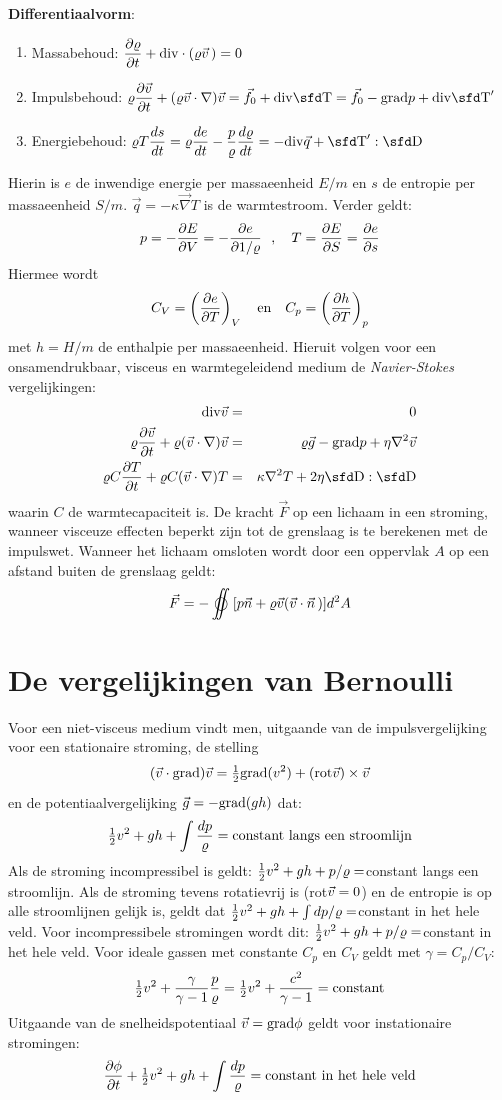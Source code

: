 \documentclass[twoside]{report}
\begin{document}
{\large\bf Differentiaalvorm}:
\begin{enumerate}
\item Massabehoud: $\displaystyle\frac{\partial \varrho}{\partial t}+{\rm div}\cdot(\varrho\vec{v}\,)=0$
\item Impulsbehoud: $\displaystyle\varrho\Q{\vv}{t}+(\varrho\vv\cdot\nabla)\vv=\vec{f}_0+{\rm div}\TT=\vec{f}_0-{\rm grad}p+{\rm div}\TT'$
\item Energiebehoud: $\displaystyle\varrho T\frac{ds}{dt}=\varrho\frac{de}{dt}-\frac{p}{\varrho}\frac{d\varrho}{dt}=-{\rm div}\vec{q}+\TT':\DD$
\end{enumerate}
Hierin is $e$ de inwendige energie per massaeenheid $E/m$ en $s$ de entropie
per massaeenheid $S/m$. $\vec{q}=-\kappa\vec{\nabla}T$ is de warmtestroom.
Verder geldt:
\[
p=-\frac{\partial E}{\partial V}=-\frac{\partial e}{\partial 1/\varrho}~~,~~~T=\frac{\partial E}{\partial S}=\frac{\partial e}{\partial s}
\]
Hiermee wordt
\[
C_V=\left(\frac{\partial e}{\partial T}\right)_{V}~~~\mbox{en}~~~C_p=\left(\frac{\partial h}{\partial T}\right)_{p}
\]
met $h=H/m$ de enthalpie per massaeenheid.
\npar
Hieruit volgen voor een onsamendrukbaar, visceus en warmtegeleidend medium
de {\it Navier-Stokes} vergelijkingen:
\begin{eqnarray*}
{\rm div}\vv&=&0\\
\varrho\Q{\vv}{t}+\varrho(\vv\cdot\nabla)\vv&=&\varrho\vec{g}-{\rm grad}p+\eta\nabla^2\vv\\
\varrho C\Q{T}{t}+\varrho C(\vv\cdot\nabla)T&=&\kappa\nabla^2 T+2\eta\DD:\DD
\end{eqnarray*}
waarin $C$ de warmtecapaciteit is. De kracht $\vec{F}$ op een lichaam in een
stroming, wanneer visceuze effecten beperkt zijn tot de grenslaag is te
berekenen met de impulswet. Wanneer het lichaam omsloten wordt door een
oppervlak $A$ op een afstand buiten de grenslaag geldt:
\[
\vec{F}=-\oiint[p\vec{n}+\varrho\vv(\vv\cdot\vvec{n})]d^2A
\]

\section{De vergelijkingen van Bernoulli}
Voor een niet-visceus medium vindt men, uitgaande van de impulsvergelijking
voor een stationaire stroming, de stelling
\[
(\vec{v}\cdot{\rm grad})\vec{v}=\mbox{$\frac{1}{2}$}{\rm grad}(v^2)+({\rm rot}\vec{v})\times\vec{v}
\]
en de potentiaalvergelijking $\vec{g}=-{\rm grad}(gh)$ dat:
\[
\mbox{$\frac{1}{2}$} v^2+gh+\int\frac{dp}{\varrho}=\mbox{constant langs een stroomlijn}
\]
Als de stroming incompressibel is geldt: $\mbox{$\frac{1}{2}$} v^2+gh+p/\varrho=$constant
langs een stroomlijn. Als de stroming tevens rotatievrij is (rot$\vec{v}=0$)
en de entropie is op alle stroomlijnen gelijk is, geldt dat
$\mbox{$\frac{1}{2}$} v^2+gh+\int dp/\varrho=$constant in het hele veld. Voor incompressibele
stromingen wordt dit: $\mbox{$\frac{1}{2}$} v^2+gh+p/\varrho=$constant in het hele veld.
Voor ideale gassen met constante $C_p$ en $C_V$ geldt met $\gamma=C_p/C_V$:
\[
\mbox{$\frac{1}{2}$} v^2+\frac{\gamma}{\gamma-1}\frac{p}{\varrho}=\mbox{$\frac{1}{2}$} v^2+\frac{c^2}{\gamma-1}=\mbox{constant}
\]
Uitgaande van de snelheidspotentiaal $\vec{v}={\rm grad}\phi$ geldt voor
instationaire stromingen:
\[
\frac{\partial \phi}{\partial t}+\mbox{$\frac{1}{2}$} v^2+gh+\int\frac{dp}{\varrho}=\mbox{constant in het hele veld}
\]
\end{document}
